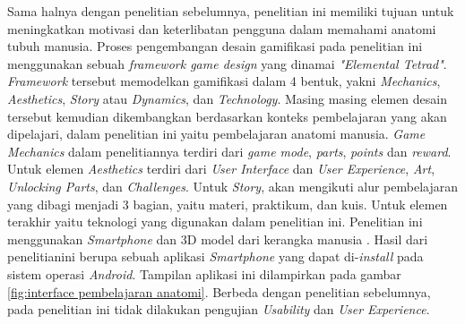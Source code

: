Sama halnya dengan penelitian sebelumnya, penelitian ini memiliki tujuan untuk meningkatkan motivasi dan keterlibatan pengguna dalam memahami anatomi tubuh manusia.
Proses pengembangan desain gamifikasi pada penelitian ini menggunakan sebuah \textit{framework game design} yang dinamai \textit{"Elemental Tetrad"}\cite{AnatomyGamification}.
\textit{Framework} tersebut memodelkan gamifikasi dalam 4 bentuk, yakni \textit{Mechanics}, \textit{Aesthetics}, \textit{Story} atau \textit{Dynamics}, dan \textit{Technology}\cite{marisa2020gamifikasi}.
Masing masing elemen desain tersebut kemudian dikembangkan berdasarkan konteks pembelajaran yang akan dipelajari, dalam penelitian ini yaitu pembelajaran anatomi manusia.
\textit{Game Mechanics} dalam penelitiannya terdiri dari \textit{game mode}, \textit{parts}, \textit{points} dan \textit{reward}. 
Untuk elemen \textit{Aesthetics} terdiri dari \textit{ User Interface} dan \textit{User Experience}, \textit{Art}, \textit{Unlocking Parts}, dan \textit{Challenges}.
Untuk \textit{Story}, akan mengikuti alur pembelajaran yang dibagi menjadi 3 bagian, yaitu materi, praktikum, dan kuis\cite{AnatomyGamification}.
Untuk elemen terakhir yaitu teknologi yang digunakan dalam penelitian ini. Penelitian ini menggunakan \textit{Smartphone} dan 3D model dari kerangka manusia \cite{AnatomyGamification}.
Hasil dari penelitianini berupa sebuah aplikasi \textit{Smartphone} yang dapat di-\textit{install} pada sistem operasi \textit{Android}.
Tampilan aplikasi ini dilampirkan pada gambar \ref*{fig:interface pembelajaran anatomi}.
Berbeda dengan penelitian sebelumnya, pada penelitian ini tidak dilakukan pengujian \textit{Usability} dan \textit{User Experience}.
